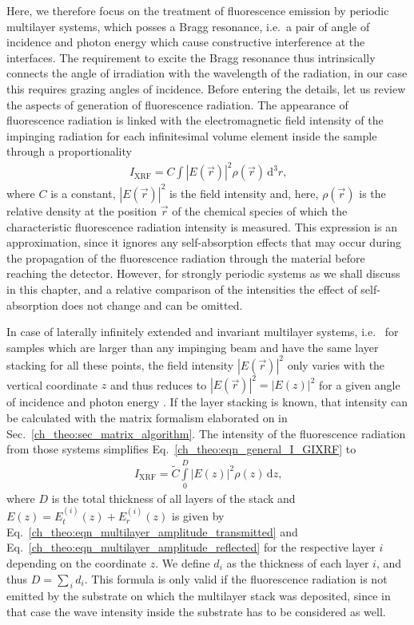Here, we therefore focus on the treatment of fluorescence emission by periodic multilayer systems, which posses a Bragg resonance, i.e.~a pair of angle of incidence and photon energy which cause constructive interference at the interfaces. The requirement to excite the Bragg resonance thus intrinsically connects the angle of irradiation with the wavelength of the radiation, in our case this requires grazing angles of incidence. Before entering the details, let us review the aspects of generation of fluorescence radiation. The appearance of fluorescence radiation is linked with the electromagnetic field intensity of the impinging radiation for each infinitesimal volume element inside the sample through a proportionality
\begin{align}
 I_\text{XRF} = C \int |E(\vec{r})|^2 \rho(\vec{r}) 
\,\text{d}^3 r \text{,} \label{ch_theo:eqn_general_I_GIXRF}
\end{align}
where $C$ is a constant, $|E(\vec{r})|^2$ is the field intensity and, here, $\rho(\vec{r})$ is the relative density at the position $\vec{r}$ of the chemical species of which the characteristic fluorescence radiation intensity is measured. This expression is an approximation, since it ignores any self-absorption effects that may occur during the propagation of the fluorescence radiation through the material before reaching the detector. However, for strongly periodic systems as we shall discuss in this chapter, and a relative comparison of the intensities the effect of self-absorption does not change and can be omitted.


In case of laterally infinitely extended and invariant multilayer systems, i.e.~ for samples which are larger than any impinging beam and have the same layer stacking for all these points, the field intensity $|E(\vec{r})|^2$ only varies with the vertical coordinate $z$ and thus reduces to $|E(\vec{r})|^2 = |E(z)|^2$ for a given angle of incidence and photon energy \cite{de_boer_glancing-incidence_1991}. If the layer stacking is known, that intensity can be calculated with the matrix formalism elaborated on in Sec.~\ref{ch_theo:sec_matrix_algorithm}. The intensity of the fluorescence radiation from those systems simplifies Eq.~\eqref{ch_theo:eqn_general_I_GIXRF} to 
\begin{align}
 I_\text{XRF} = \tilde{C} \int\limits_0^{D} |E(z)|^2 \rho(z) 
\,\text{d}z \text{,} \label{ch_theo:eqn_I_GIXRF_multilayer}
\end{align}
where $D$ is the total thickness of all layers of the stack and $E(z) = E^{(i)}_t(z) + E^{(i)}_r(z)$ is given by Eq.~\eqref{ch_theo:eqn_multilayer_amplitude_transmitted} and Eq.~\eqref{ch_theo:eqn_multilayer_amplitude_reflected} for the respective layer $i$ depending on the coordinate $z$. We define $d_i$ as the thickness of each layer $i$, and thus $D = \sum_{\,i} d_i$. This formula is only valid if the fluorescence radiation is not emitted by the substrate on which the multilayer stack was deposited, since in that case the wave intensity inside the substrate has to be considered as well.


